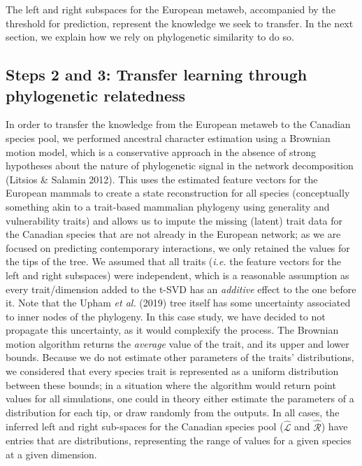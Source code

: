 \documentclass[11pt]{article}
\begin{document}
The left and right subspaces for the European metaweb, accompanied by
the threshold for prediction, represent the knowledge we seek to
transfer. In the next section, we explain how we rely on phylogenetic
similarity to do so.

\hypertarget{steps-2-and-3-transfer-learning-through-phylogenetic-relatedness}{%
\subsection{Steps 2 and 3: Transfer learning through phylogenetic
relatedness}\label{steps-2-and-3-transfer-learning-through-phylogenetic-relatedness}}

In order to transfer the knowledge from the European metaweb to the
Canadian species pool, we performed ancestral character estimation using
a Brownian motion model, which is a conservative approach in the absence
of strong hypotheses about the nature of phylogenetic signal in the
network decomposition (Litsios \& Salamin 2012). This uses the estimated
feature vectors for the European mammals to create a state
reconstruction for all species (conceptually something akin to a
trait-based mammalian phylogeny using generality and vulnerability
traits) and allows us to impute the missing (latent) trait data for the
Canadian species that are not already in the European network; as we are
focused on predicting contemporary interactions, we only retained the
values for the tips of the tree. We assumed that all traits (\emph{i.e.}
the feature vectors for the left and right subspaces) were independent,
which is a reasonable assumption as every trait/dimension added to the
t-SVD has an \emph{additive} effect to the one before it. Note that the
Upham \emph{et al.} (2019) tree itself has some uncertainty associated
to inner nodes of the phylogeny. In this case study, we have decided to
not propagate this uncertainty, as it would complexify the process. The
Brownian motion algorithm returns the \emph{average} value of the trait,
and its upper and lower bounds. Because we do not estimate other
parameters of the traits' distributions, we considered that every
species trait is represented as a uniform distribution between these
bounds; in a situation where the algorithm would return point values for
all simulations, one could in theory either estimate the parameters of a
distribution for each tip, or draw randomly from the outputs. In all
cases, the inferred left and right sub-spaces for the Canadian species
pool (\(\hat{\mathscr{L}}\) and \(\hat{\mathscr{R}}\)) have entries that
are distributions, representing the range of values for a given species
at a given dimension.
\end{document}
